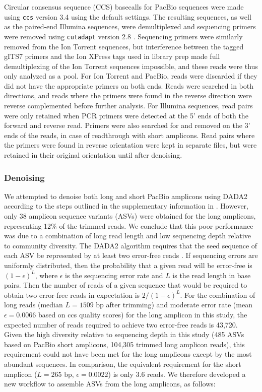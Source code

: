 \documentclass[
  12pt,
]{article}
\begin{document}
Circular consensus sequence (CCS) basecalls for PacBio sequences were made using \texttt{ccs} version 3.4 \autocite{pacificbiosciences2019} using the default settings.
The resulting sequences, as well as the paired-end Illumina sequences, were demultiplexed and sequencing primers were removed using \texttt{cutadapt} version 2.8 \autocite{martin2011}.
Sequencing primers were similarly removed from the Ion Torrent sequences, but interference between the tagged gITS7 primers and the Ion XPress tags used in library prep made full demultiplexing of the Ion Torrent sequences impossible, and these reads were thus only analyzed as a pool.
For Ion Torrent and PacBio, reads were discarded if they did not have the appropriate primers on both ends.
Reads were searched in both directions, and reads where the primers were found in the reverse direction were reverse complemented before further analysis.
For Illumina sequences, read pairs were only retained when PCR primers were detected at the 5' ends of both the forward and reverse read.
Primers were also searched for and removed on the 3' ends of the reads, in case of readthrough with short amplicons.
Read pairs where the primers were found in reverse orientation were kept in separate files, but were retained in their original orientation until after denoising.

\hypertarget{denoising}{%
\subsubsection{Denoising}\label{denoising}}

We attempted to denoise both long and short PacBio amplicons using DADA2 according to the steps outlined in the supplementary information in \textcite{callahan2019}.
However, only 38 amplicon sequence variants (ASVs) were obtained for the long amplicons, representing 12\% of the trimmed reads.
We conclude that this poor performance was due to a combination of long read length and low sequencing depth relative to community diversity.
The DADA2 algorithm requires that the seed sequence of each ASV be represented by at least two error-free reads \autocite{callahan2016}.
If sequencing errors are uniformly distributed, then the probability that a given read will be error-free is \((1-\epsilon)^L\), where \(\epsilon\) is the sequencing error rate and \(L\) is the read length in base pairs.
Then the number of reads of a given sequence that would be required to obtain two error-free reads in expectation is \(2/(1-\epsilon)^L\).
For the combination of long reads (median \(L=1509 \text{ bp}\) after trimming) and moderate error rate (mean \(\epsilon= 0.0066\) based on ccs quality scores) for the long amplicon in this study, the expected number of reads required to achieve two error-free reads is 43,720.
Given the high diversity relative to sequencing depth in this study (485 ASVs based on PacBio short amplicons, 104,305 trimmed long amplicon reads), this requirement could not have been met for the long amplicons except by the most abundant sequences.
In comparison, the equivalent requirement for the short amplicon (\(L=265 \text{ bp}\), \(\epsilon=0.0022\)) is only 3.6 reads.
We therefore developed a new workflow to assemble ASVs from the long amplicons, as follows:
\end{document}
